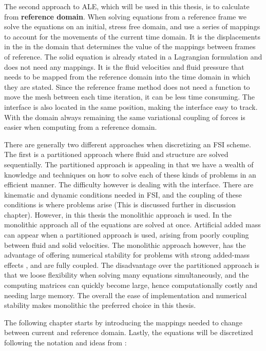 The second approach to ALE, which will be used in this thesis, is to calculate from \textbf{reference domain}.
When solving equations from a reference frame we solve the equations on an initial, stress free domain, and use a series of mappings to account for the movements of the current time domain. It is the displacements in the in the domain that determines the value of the mappings between frames of reference. The solid equation is already stated in a Lagrangian formulation and does not need any mappings. It is the fluid velocities and fluid pressure that needs to be mapped from the reference domain into the time domain in which they are stated.
Since the reference frame method does not need a function to move the mesh between each time iteration, it can be less time consuming. The interface is also located in the same position, making the interface easy to track. With the domain always remaining the same variational coupling of forces is easier when computing from a reference domain.\newline

There are generally two different approaches when discretizing an FSI scheme. The first is a partitioned approach where fluid and structure are solved sequentially. The partitioned approach is appealing in that we have a wealth of knowledge and techniques on how to solve each of these kinds of problems in an efficient manner. The difficulty however is dealing with the interface. There are kinematic and dynamic conditions needed in FSI, and the coupling of these conditions is where problems arise (This is discussed further in discussion chapter). However, in this thesis the monolithic approach is used. In the monolithic approach all of the equations are solved at once. Artificial added mass can appear when a partitioned approach is used, arising from poorly coupling between fluid and solid velocities. The monolithic approach however, has the advantage of offering numerical stability for problems with strong added-mass effects \cite{Liu2014}, and are fully coupled. The disadvantage over the partitioned approach is that we loose flexibility when solving many equations simultaneously, and the computing matrices can quickly become large, hence computationally costly and needing large memory. The overall the ease of implementation and numerical stability makes monolithic the preferred choice in this thesis. \newline

The following chapter starts by introducing the mappings needed to change between current and reference domain. Lastly, the equations will be discretized following the notation and ideas from \cite{Richter2016}:

